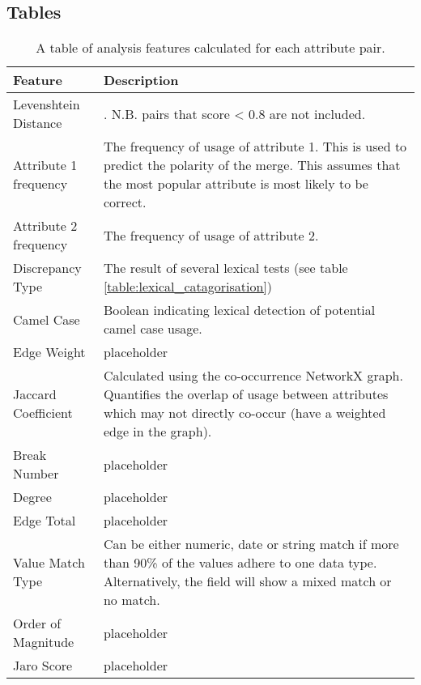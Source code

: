 \documentclass{bmcart}
\begin{document}
\begin{backmatter}

\section*{Tables}
\begin{table}[h!]
\caption{A table of analysis features calculated for each attribute pair.}
      \begin{tabular}{|p{3cm}|p{10cm}|}
        \hline
           Feature & Description  \\ \hline
           Levenshtein Distance &  \cite{levenshtein1966binary}. N.B. pairs that score < 0.8 are not included. \\
           Attribute 1 frequency & The frequency of usage of attribute 1. This is used to predict the polarity of the merge. This assumes that the most popular attribute is most likely to be correct. \\
           Attribute 2 frequency & The frequency of usage of attribute 2.  \\
           Discrepancy Type & The result of several lexical tests (see table \ref{table:lexical_catagorisation}) \\
           Camel Case & Boolean indicating lexical detection of potential camel case usage. \\
           Edge Weight & placeholder \\
           Jaccard Coefficient \cite{jaccard1901distribution} & Calculated using the co-occurrence NetworkX graph. Quantifies the overlap of usage between attributes which may not directly co-occur (have a weighted edge in the graph). \\
           Break Number & placeholder \\
           Degree & placeholder \\
           Edge Total & placeholder \\
           Value Match Type & Can be either numeric, date or string match if more than 90\% of the values adhere to one data type. Alternatively, the field will show a mixed match or no match. \\
           Order of Magnitude & placeholder \\
           Jaro Score & placeholder \\ \hline
      \end{tabular}
\label{table:features}
\end{table}


\end{backmatter}
\end{document}
